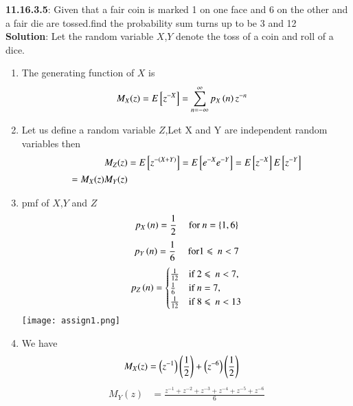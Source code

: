 \documentclass[journal,12pt,onecolumn]{IEEEtran}
\begin{document}
 \bigskip 
 \renewcommand{\thefigure}{\theenumi} 
 \renewcommand{\thetable}{\theenumi} 
 \textbf{11.16.3.5}: 
 Given that a fair coin is marked 1 on one face and 6 on the other and a fair die are tossed.find the probability sum turns up to be 3 and 12 \\ 
 \textbf{Solution}: 
         Let the random variable  $X$,$Y$ denote the toss of a coin and roll of a dice.
 \begin{enumerate}[label=(\alph*)] 
	 \item   The  generating function of $X$ is  
                         \begin{align} 
				 M_X(z) &= E{}\left[z^{-X}\right] 
				 = \sum_{n=-\infty}^{\infty}p_X\left(n\right)z^{-n}  
                         \end{align} 
		 \item Let us define a random variable $Z$,Let X and Y are independent random variables then 
			 \begin{align}
				 M_Z(z) &= E{}\left[z^{-(X + Y)}\right] 
					 = E{}\left[e^{-X}e^{-Y}\right] = E{}\left[z^{-X}\right]E{}\left[z^{-Y}\right] \\
					 = M_X(z)M_Y(z) 
			 \end{align}
		 \item pmf of $X$,$Y$ and $Z$
			 \begin{align}
				 p_X\left(n\right) &= \frac{1}{2} & \text{ for $n = \{1,6\}$} 
			 \end{align}
			 \begin{align}
				 p_Y\left(n\right) &= \frac{1}{6} & \text{ for} 1 \leqslant\: n < 7
			 \end{align}
			 \begin{align}
				 p_Z\left(n\right) = \begin{cases} \frac{1}{12} & \text{if } 2 \leqslant\: n < 7 , \\ \frac{1}{6} & \text{if $n = 7$,} \\ \frac{1}{12} & \text{if } 8 \leqslant\: n < 13 \end{cases}
			 \end{align}
			 \texttt{[image: assign1.png]}
		 \item	We have 
			\begin{align}
				M_X(z) &= \left(z^{-1}\right)\left(\frac{1}{2}\right) + \left(z^{-6}\right)\left(\frac{1}{2}\right) 
			\end{align}
			 \begin{align}
				 M_Y(z) &= \frac{z^{-1} + z^{-2} + z^{-3} + z^{-4} + z^{-5} + z^{-6}}{6} 
			 \end{align}
			\begin{align}

\end{align}
\end{enumerate}
\end{document}
